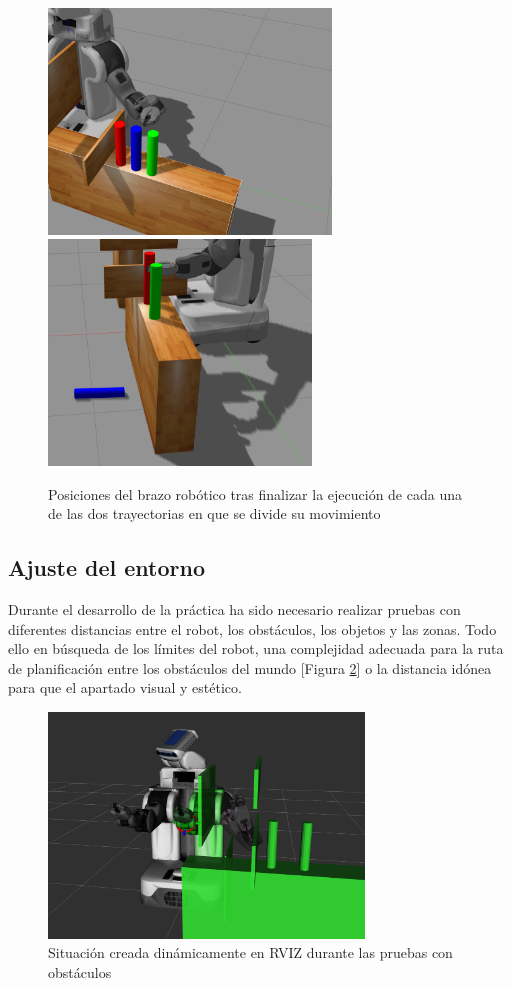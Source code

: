 \documentclass[12pt,spanish,chapterprefix, numbers=noenddot]{book}
\numberwithin{equation}{section}
\numberwithin{figure}{section}
\begin{document}
\begin{figure}[hbt!]
\centering
\includegraphics[height=6cm]{Figs/pos1_1.png}
\includegraphics[height=6cm]{Figs/pose2_2.png}
\par
\caption{\label{fig:posiciones}Posiciones del brazo robótico tras finalizar la ejecución de cada una de las dos trayectorias en que se divide su movimiento}
\end{figure}

\subsection{Ajuste del entorno}

Durante el desarrollo de la práctica ha sido necesario realizar pruebas con diferentes distancias entre el robot, los obstáculos, los objetos y las zonas. Todo ello en búsqueda de los límites del robot, una complejidad adecuada para la ruta de planificación entre los obstáculos del mundo [Figura \ref{fig:rviz}] o la distancia idónea para que el apartado visual y estético. 

\begin{figure}[hbt!]
\centering
\includegraphics[height=6cm]{Figs/RVIZ.png}
\par
\caption{\label{fig:rviz}Situación creada dinámicamente en RVIZ durante las pruebas con obstáculos}
\end{figure}
\end{document}
